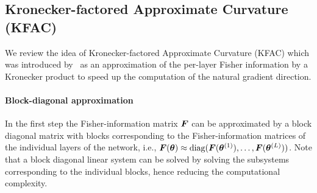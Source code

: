 \subsection{Kronecker-factored Approximate Curvature (KFAC)}


We review the idea of Kronecker-factored Approximate Curvature (KFAC) which was introduced by~\citet{?, martens2015optimizing, ?} as an approximation of the per-layer Fisher information by a Kronecker product to speed up the computation of the natural gradient direction. 


\paragraph{Block-diagonal approximation}
In the first step the Fisher-information matrix ${\bm{F}}$ can be approximated by a block diagonal matrix with blocks corresponding to the Fisher-information matrices of the individual layers of the network, i.e., ${\bm{F}}({\bm{\theta}}) \approx \operatorname{diag}({\bm{F}}({\bm{\theta}}^{(1)}), \dots, {\bm{F}}({\bm{\theta}}^{(L)}))$. 
Note that a block diagonal linear system can be solved by solving the subsystems corresponding to the individual blocks, hence reducing the computational complexity. 


